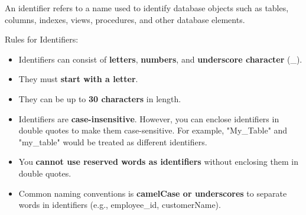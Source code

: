 \setlength{\columnsep}{3pt}
\begin{flushleft}

	An identifier refers to a name used to identify database objects such as tables, columns, indexes, views, procedures, and other database elements.
	
	\newline
	Rules for Identifiers:
	\begin{itemize}
		\item Identifiers can consist of \textbf{letters}, \textbf{numbers}, and \textbf{underscore character} (\_).
		\item They must \textbf{start with a letter}.
		\item They can be up to \textbf{30 characters} in length.
		\item Identifiers are \textbf{case-insensitive}. However, you can enclose identifiers in double quotes to make them case-sensitive. For example, "My\_Table" and "my\_table" would be treated as different identifiers.
		\item You \textbf{cannot use reserved words as identifiers} without enclosing them in double quotes.
		\item Common naming conventions is \textbf{camelCase or underscores} to separate words in identifiers (e.g., employee\_id, customerName).
	\end{itemize}


		
\end{flushleft}

\newpage





